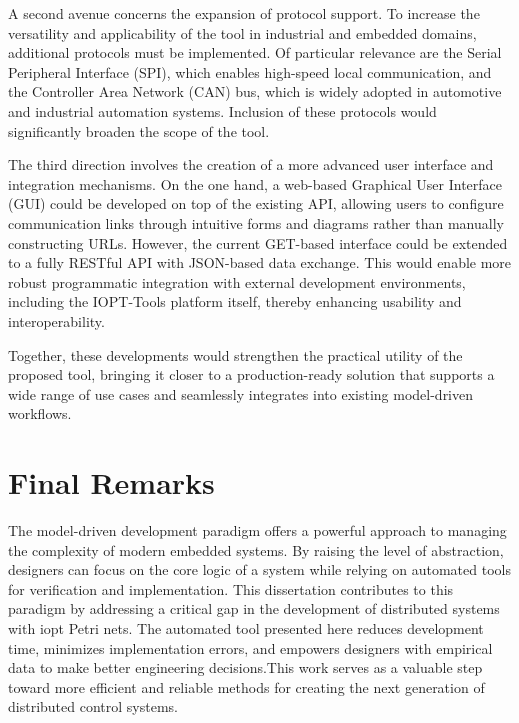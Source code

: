 A second avenue concerns the expansion of protocol support. To increase the versatility and applicability of the tool in industrial and embedded domains, additional protocols must be implemented. Of particular relevance are the Serial Peripheral Interface (SPI), which enables high-speed local communication, and the Controller Area Network (CAN) bus, which is widely adopted in automotive and industrial automation systems. Inclusion of these protocols would significantly broaden the scope of the tool.

The third direction involves the creation of a more advanced user interface and integration mechanisms. On the one hand, a web-based Graphical User Interface (GUI) could be developed on top of the existing API, allowing users to configure communication links through intuitive forms and diagrams rather than manually constructing URLs. However, the current GET-based interface could be extended to a fully RESTful API with JSON-based data exchange. This would enable more robust programmatic integration with external development environments, including the IOPT-Tools platform itself, thereby enhancing usability and interoperability.

Together, these developments would strengthen the practical utility of the proposed tool, bringing it closer to a production-ready solution that supports a wide range of use cases and seamlessly integrates into existing model-driven workflows.

\section{Final Remarks}
\label{sec:final_remarks}

The model-driven development paradigm offers a powerful approach to managing the complexity of modern embedded systems. By raising the level of abstraction, designers can focus on the core logic of a system while relying on automated tools for verification and implementation. This dissertation contributes to this paradigm by addressing a critical gap in the development of distributed systems with \gls{iopt} Petri nets. The automated tool presented here reduces development time, minimizes implementation errors, and empowers designers with empirical data to make better engineering decisions.This work serves as a valuable step toward more efficient and reliable methods for creating the next generation of distributed control systems.

